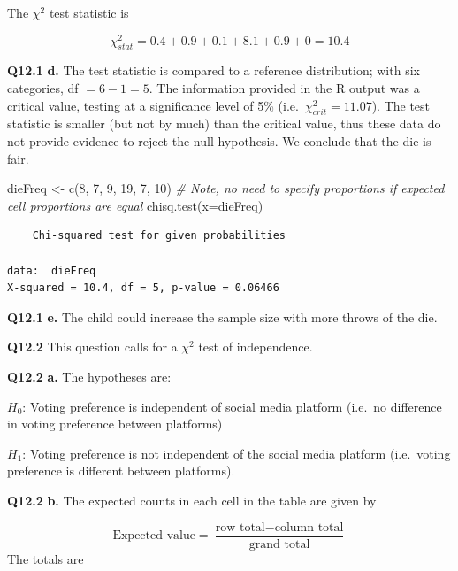 \documentclass[
  oneside]{krantz}
\newenvironment{Shaded}{\begin{snugshade}}{\end{snugshade}}
\newcommand{\AttributeTok}[1]{\textcolor[rgb]{0.77,0.63,0.00}{#1}}
\newcommand{\CommentTok}[1]{\textcolor[rgb]{0.56,0.35,0.01}{\textit{#1}}}
\newcommand{\DecValTok}[1]{\textcolor[rgb]{0.00,0.00,0.81}{#1}}
\newcommand{\FunctionTok}[1]{\textcolor[rgb]{0.00,0.00,0.00}{#1}}
\newcommand{\NormalTok}[1]{#1}
\newcommand{\OtherTok}[1]{\textcolor[rgb]{0.56,0.35,0.01}{#1}}
\begin{document}
The \(\chi^2\) test statistic is

\[\chi_{stat}^2 = 0.4 + 0.9 + 0.1 + 8.1 + 0.9 + 0 = 10.4\]

\textbf{Q12.1} \textbf{d.} The test statistic is compared to a reference distribution; with six categories, df \(= 6 - 1 = 5\). The information provided in the R output was a critical value, testing at a significance level of 5\% (i.e.~\(\chi^2_{crit}=11.07\)). The test statistic is smaller (but not by much) than the critical value, thus these data do not provide evidence to reject the null hypothesis. We conclude that the die is fair.

\begin{Shaded}
\begin{Highlighting}[]
\NormalTok{dieFreq }\OtherTok{\textless{}{-}} \FunctionTok{c}\NormalTok{(}\DecValTok{8}\NormalTok{, }\DecValTok{7}\NormalTok{, }\DecValTok{9}\NormalTok{, }\DecValTok{19}\NormalTok{, }\DecValTok{7}\NormalTok{, }\DecValTok{10}\NormalTok{)}
\CommentTok{\# Note, no need to specify proportions if expected cell proportions are equal}
\FunctionTok{chisq.test}\NormalTok{(}\AttributeTok{x=}\NormalTok{dieFreq)}
\end{Highlighting}
\end{Shaded}

\begin{verbatim}
    Chi-squared test for given probabilities

data:  dieFreq
X-squared = 10.4, df = 5, p-value = 0.06466
\end{verbatim}

\textbf{Q12.1} \textbf{e.} The child could increase the sample size with more throws of the die.

\textbf{Q12.2} This question calls for a \(\chi^2\) test of independence.

\textbf{Q12.2} \textbf{a.} The hypotheses are:

\(H_0\): Voting preference is independent of social media platform (i.e.~no difference in voting preference between platforms)

\(H_1\): Voting preference is not independent of the social media platform (i.e.~voting preference is different between platforms).

\textbf{Q12.2} \textbf{b.} The expected counts in each cell in the table are given by

\[\textrm{Expected value} = \frac{\textrm{row total} - \textrm{column total}}{\textrm{grand total}}\]
The totals are
\end{document}
